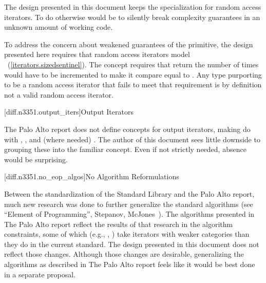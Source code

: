 The design presented in this document keeps the specialization for random access iterators. To do
otherwise would be to silently break complexity guarantees in an unknown amount of working code.

To address the concern about weakened guarantees of the  primitive, the design
presented here requires that random access iterators model
~(\ref{iterators.sizedsentinel}). The 
concept requires that  return the number of times  would have to be
incremented to make it compare equal to . Any type purporting to be a random access
iterator that fails to meet that requirement is by definition not a valid random access iterator.

[diff.n3351.output_iters]{Output Iterators}

\pnum
The Palo Alto report does not define concepts for output iterators, making do with
, , and (where needed) . The
author of this document sees little downside to grouping these into the familiar
 concept. Even
if not strictly needed,  absence would be surprising.

[diff.n3351.no_eop_algos]{No Algorithm Reformulations}

\pnum
Between the standardization of the Standard Library and the Palo Alto report, much new research was
done to further generalize the standard algorithms
(see ``Element of Programming'', Stepanov, McJones~\cite{Stepanov:2009:EP:1614221}). The algorithms
presented in The Palo Alto report reflect the results of that research in the algorithm constraints,
some of which (e.g., , ) take iterators with weaker categories than
they do in the current standard. The design presented in this document does not reflect those
changes. Although those changes are desirable, generalizing the algorithms as described in The Palo
Alto report feels like it would be best done in a separate proposal.
